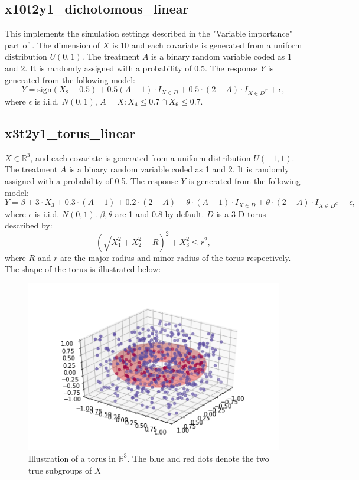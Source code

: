 \documentclass[12pt]{article}
\begin{document}
\subsection*{x10t2y1\_dichotomous\_linear}
This implements the simulation settings described in the "Variable importance" part of \cite{fu2016estimating}. The dimension of $X$ is 10 and each covariate is generated from a uniform distribution $U(0,1)$. The treatment $A$ is a binary random variable coded as 1 and 2. It is randomly assigned with a probability of 0.5. The response $Y$ is generated from the following model:
\begin{equation*}
Y=\text{sign}(X_2-0.5)+0.5(A-1)\cdot I_{X\in D}+0.5\cdot(2-A)\cdot I_{X\in D^C}+\epsilon,
\end{equation*}
where $\epsilon$ is i.i.d. $N(0,1)$, $A={X:X_4\le 0.7\cap X_6 \le 0.7}$.

\subsection*{x3t2y1\_torus\_linear}
$X\in \mathbb{R}^3$, and each covariate is generated from a uniform distribution $U(-1,1)$. The treatment $A$ is a binary random variable coded as 1 and 2. It is randomly assigned with a probability of 0.5. The response $Y$ is generated from the following model:
\begin{equation*}
Y= \beta + 3\cdot X_3 + 0.3 \cdot (A-1) + 0.2 \cdot (2-A) +
\theta \cdot (A-1)\cdot I_{X\in D} + \theta \cdot (2-A) \cdot I_{X\in D^C}+\epsilon,
\end{equation*}
where $\epsilon$ is i.i.d. $N(0,1)$. $\beta, \theta$ are 1 and 0.8 by default. $D$ is a 3-D torus described by:
\begin{equation*}
(\sqrt{X_1^2+X_2^2}-R)^2+X_3^2\le r^2,
\end{equation*}
where $R$ and $r$ are the major radius and minor radius of the torus respectively. The shape of the torus is illustrated below:
\begin{figure}
	\centering
	\includegraphics[width=0.7\linewidth]{donut_shape}
	\caption{Illustration of a torus in $\mathbb{R}^3$. The blue and red dots denote the two true subgroups of $X$}
\end{figure}
\end{document}
